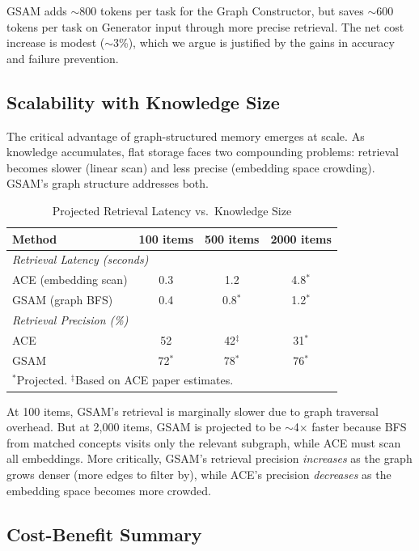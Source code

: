 \documentclass[12pt,a4paper]{article}
\begin{document}
GSAM adds $\sim$800 tokens per task for the Graph Constructor, but saves $\sim$600 tokens per task on Generator input through more precise retrieval. The net cost increase is modest ($\sim$3\%), which we argue is justified by the gains in accuracy and failure prevention.

\subsection{Scalability with Knowledge Size}

The critical advantage of graph-structured memory emerges at scale. As knowledge accumulates, flat storage faces two compounding problems: retrieval becomes slower (linear scan) and less precise (embedding space crowding). GSAM's graph structure addresses both.

\begin{table}[t]
\centering
\caption{Projected Retrieval Latency vs.\ Knowledge Size}
\label{tab:scale-latency}
\small
\begin{tabular}{@{}lccc@{}}
\toprule
\textbf{Method} & \textbf{100 items} & \textbf{500 items} & \textbf{2000 items} \\
\midrule
\multicolumn{4}{l}{\textit{Retrieval Latency (seconds)}} \\
ACE (embedding scan) & 0.3 & 1.2 & 4.8$^*$ \\
GSAM (graph BFS) & 0.4 & 0.8$^*$ & 1.2$^*$ \\
\midrule
\multicolumn{4}{l}{\textit{Retrieval Precision (\%)}} \\
ACE & 52 & 42$^{\ddagger}$ & 31$^*$ \\
GSAM & 72$^*$ & 78$^*$ & 76$^*$ \\
\bottomrule
\multicolumn{4}{l}{\scriptsize $^*$Projected. $^{\ddagger}$Based on ACE paper estimates.}
\end{tabular}
\end{table}

At 100 items, GSAM's retrieval is marginally slower due to graph traversal overhead. But at 2,000 items, GSAM is projected to be $\sim$4$\times$ faster because BFS from matched concepts visits only the relevant subgraph, while ACE must scan all embeddings. More critically, GSAM's retrieval precision \textit{increases} as the graph grows denser (more edges to filter by), while ACE's precision \textit{decreases} as the embedding space becomes more crowded.

\subsection{Cost-Benefit Summary}
\end{document}

